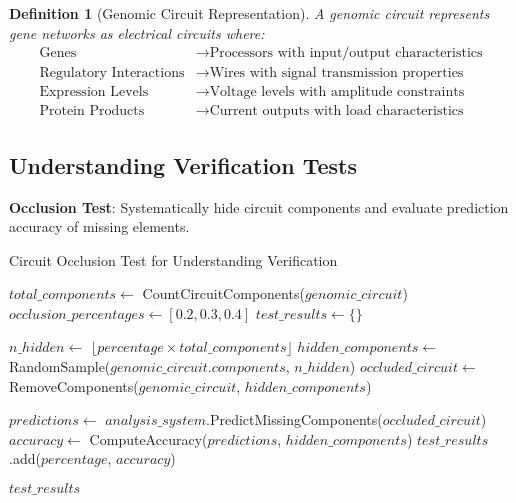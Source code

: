 \documentclass[12pt,a4paper]{article}
\newtheorem{definition}[theorem]{Definition}
\begin{document}
\begin{definition}[Genomic Circuit Representation]
A genomic circuit represents gene networks as electrical circuits where:
\begin{align}
\text{Genes} &\rightarrow \text{Processors with input/output characteristics} \\
\text{Regulatory Interactions} &\rightarrow \text{Wires with signal transmission properties} \\
\text{Expression Levels} &\rightarrow \text{Voltage levels with amplitude constraints} \\
\text{Protein Products} &\rightarrow \text{Current outputs with load characteristics}
\end{align}
\end{definition}

\subsection{Understanding Verification Tests}

\textbf{Occlusion Test}: Systematically hide circuit components and evaluate prediction accuracy of missing elements.

\begin{algorithm}
\caption{Circuit Occlusion Test for Understanding Verification}
\begin{algorithmic}
    \State $total\_components \gets$ CountCircuitComponents($genomic\_circuit$)
    \State $occlusion\_percentages \gets [0.2, 0.3, 0.4]$
    \State $test\_results \gets \{\}$
    
        \State $n\_hidden \gets$ $\lfloor percentage \times total\_components \rfloor$
        \State $hidden\_components \gets$ RandomSample($genomic\_circuit.components$, $n\_hidden$)
        \State $occluded\_circuit \gets$ RemoveComponents($genomic\_circuit$, $hidden\_components$)
        
        \State $predictions \gets$ $analysis\_system$.PredictMissingComponents($occluded\_circuit$)
        \State $accuracy \gets$ ComputeAccuracy($predictions$, $hidden\_components$)
        \State $test\_results$.add($percentage$, $accuracy$)
    \EndFor
    
    \State \Return $test\_results$
\EndProcedure
\end{algorithmic}
\end{algorithm}
\end{document}
